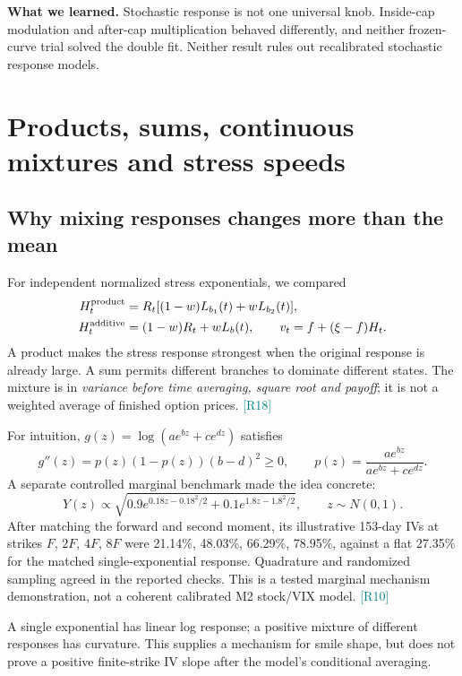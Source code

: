 \documentclass[11pt,a4paper]{article}
\newcommand{\src}[1]{\textcolor{teal}{\small[#1]}}
\newcommand{\lesson}[1]{\par\smallskip\noindent\colorbox{teal!9}{\parbox{\dimexpr\linewidth-2\fboxsep}{\textbf{What we learned.} #1}}\par\smallskip}
\begin{document}
\lesson{Stochastic response is not one universal knob. Inside-cap modulation and after-cap multiplication behaved differently, and neither frozen-curve trial solved the double fit. Neither result rules out recalibrated stochastic response models.}

\section{Products, sums, continuous mixtures and stress speeds}
\subsection{Why mixing responses changes more than the mean}
For independent normalized stress exponentials, we compared
\begin{align}
H_t^{\rm product}&=R_t[(1-w)L_{b_1}(t)+wL_{b_2}(t)],\\
H_t^{\rm additive}&=(1-w)R_t+wL_b(t),\qquad
v_t=f+(\xi-f)H_t.
\end{align}
A product makes the stress response strongest when the original response is already large. A sum permits different branches to dominate different states. The mixture is in \emph{variance before time averaging, square root and payoff}; it is not a weighted average of finished option prices. \src{R18}

For intuition, $g(z)=\log(ae^{bz}+ce^{dz})$ satisfies
\begin{equation}
g''(z)=p(z)(1-p(z))(b-d)^2\geq0,\qquad
p(z)=\frac{ae^{bz}}{ae^{bz}+ce^{dz}}.
\end{equation}
A separate controlled marginal benchmark made the idea concrete:
\begin{equation}
Y(z)\propto\sqrt{0.9e^{0.18z-0.18^2/2}+0.1e^{1.8z-1.8^2/2}},\qquad z\sim N(0,1).
\end{equation}
After matching the forward and second moment, its illustrative 153-day IVs at strikes $F$, $2F$, $4F$, $8F$ were 21.14\%, 48.03\%, 66.29\%, 78.95\%, against a flat 27.35\% for the matched single-exponential response. Quadrature and randomized sampling agreed in the reported checks. This is a tested marginal mechanism demonstration, not a coherent calibrated M2 stock/VIX model. \src{R10}

A single exponential has linear log response; a positive mixture of different responses has curvature. This supplies a mechanism for smile shape, but does not prove a positive finite-strike IV slope after the model's conditional averaging.
\end{document}

